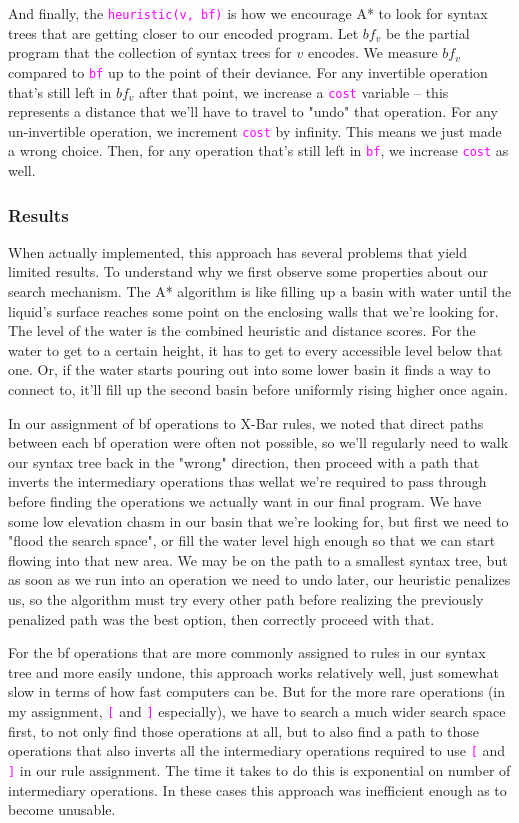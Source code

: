 \documentclass[runningheads]{llncs}
\newcommand{\code}[1]{\texttt{\textcolor{magenta}{\setlength{\fboxsep}{1pt}\colorbox{lightgray!20}{#1}}}}
\begin{document}
And finally, the \code{heuristic(v, bf)} is how we encourage A* to look for syntax trees that are getting closer to our encoded program. Let $bf_v$ be the partial program that the collection of syntax trees for $v$ encodes. We measure $bf_v$ compared to \code{bf} up to the point of their deviance. For any invertible operation that's still left in $bf_v$ after that point, we increase a \code{cost} variable -- this represents a distance that we'll have to travel to "undo" that operation. For any un-invertible operation, we increment \code{cost} by infinity. This means we just made a wrong choice. Then, for any operation that's still left in \code{bf}, we increase \code{cost} as well.

\subsubsection*{Results}
When actually implemented, this approach has several problems that yield limited results. To understand why we first observe some properties about our search mechanism. The A* algorithm  is like filling up a basin with water until the liquid's surface reaches some point on the enclosing walls that we're looking for. The level of the water is the combined heuristic and distance scores. For the water to get to a certain height, it has to get to every accessible level below that one. Or, if the water starts pouring out into some lower basin it finds a way to connect to, it'll fill up the second basin before uniformly rising higher once again.

In our assignment of bf operations to X-Bar rules, we noted that direct paths between each bf operation were often not possible, so we'll regularly need to walk our syntax tree back in the "wrong" direction, then proceed with a path that inverts the intermediary operations thas wellat we're required to pass through before finding the operations we actually want in our final program. We have some low elevation chasm in our basin that we're looking for, but first we need to "flood the search space", or fill the water level high enough so that we can start flowing into that new area. We may be on the path to a smallest syntax tree, but as soon as we run into an operation we need to undo later, our heuristic penalizes us, so the algorithm must try every other path before realizing the previously penalized path was the best option, then correctly proceed with that.

For the bf operations that are more commonly assigned to rules in our syntax tree and more easily undone, this approach works relatively well, just somewhat slow in terms of how fast computers can be. But for the more rare operations (in my assignment, \code{[} and \code{]} especially), we have to search a much wider search space first, to not only find those operations at all, but to also find a path to those operations that also inverts all the intermediary operations required to use \code{[} and \code{]} in our rule assignment. The time it takes to do this is exponential on number of intermediary operations. In these cases this approach was inefficient enough as to become unusable.
\end{document}
